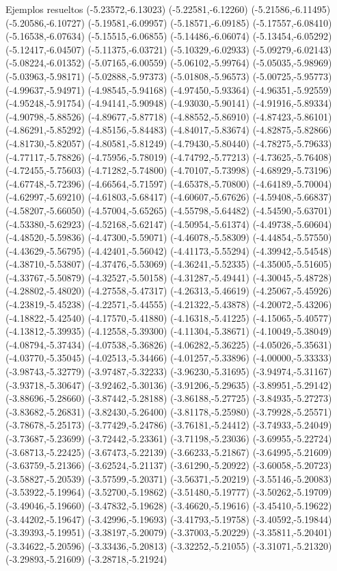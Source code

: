 \documentclass[11pt,a4paper]{article}
\begin{document}
\begin{fmex}{Ejemplos resueltos}
(-5.23572,-6.13023) (-5.22581,-6.12260) (-5.21586,-6.11495) (-5.20586,-6.10727) (-5.19581,-6.09957) (-5.18571,-6.09185) (-5.17557,-6.08410) (-5.16538,-6.07634) (-5.15515,-6.06855) (-5.14486,-6.06074) (-5.13454,-6.05292) (-5.12417,-6.04507) (-5.11375,-6.03721) (-5.10329,-6.02933) (-5.09279,-6.02143) (-5.08224,-6.01352) (-5.07165,-6.00559) (-5.06102,-5.99764) (-5.05035,-5.98969) (-5.03963,-5.98171) (-5.02888,-5.97373) (-5.01808,-5.96573) (-5.00725,-5.95773) (-4.99637,-5.94971) (-4.98545,-5.94168) (-4.97450,-5.93364) (-4.96351,-5.92559) (-4.95248,-5.91754) (-4.94141,-5.90948) (-4.93030,-5.90141) (-4.91916,-5.89334) (-4.90798,-5.88526) (-4.89677,-5.87718) (-4.88552,-5.86910) (-4.87423,-5.86101) (-4.86291,-5.85292) (-4.85156,-5.84483) (-4.84017,-5.83674) (-4.82875,-5.82866) (-4.81730,-5.82057) (-4.80581,-5.81249) (-4.79430,-5.80440) (-4.78275,-5.79633) (-4.77117,-5.78826) (-4.75956,-5.78019) (-4.74792,-5.77213) (-4.73625,-5.76408) (-4.72455,-5.75603) (-4.71282,-5.74800) (-4.70107,-5.73998) (-4.68929,-5.73196) (-4.67748,-5.72396) (-4.66564,-5.71597) (-4.65378,-5.70800) (-4.64189,-5.70004) (-4.62997,-5.69210) (-4.61803,-5.68417) (-4.60607,-5.67626) (-4.59408,-5.66837) (-4.58207,-5.66050) (-4.57004,-5.65265) (-4.55798,-5.64482) (-4.54590,-5.63701) (-4.53380,-5.62923) (-4.52168,-5.62147) (-4.50954,-5.61374) (-4.49738,-5.60604) (-4.48520,-5.59836) (-4.47300,-5.59071) (-4.46078,-5.58309) (-4.44854,-5.57550) (-4.43629,-5.56795) (-4.42401,-5.56042) (-4.41173,-5.55294) (-4.39942,-5.54548) (-4.38710,-5.53807) (-4.37476,-5.53069) (-4.36241,-5.52335) (-4.35005,-5.51605) (-4.33767,-5.50879) (-4.32527,-5.50158) (-4.31287,-5.49441) (-4.30045,-5.48728) (-4.28802,-5.48020) (-4.27558,-5.47317) (-4.26313,-5.46619) (-4.25067,-5.45926) (-4.23819,-5.45238) (-4.22571,-5.44555) (-4.21322,-5.43878) (-4.20072,-5.43206) (-4.18822,-5.42540) (-4.17570,-5.41880) (-4.16318,-5.41225) (-4.15065,-5.40577) (-4.13812,-5.39935) (-4.12558,-5.39300) (-4.11304,-5.38671) (-4.10049,-5.38049) (-4.08794,-5.37434) (-4.07538,-5.36826) (-4.06282,-5.36225) (-4.05026,-5.35631) (-4.03770,-5.35045) (-4.02513,-5.34466) (-4.01257,-5.33896) (-4.00000,-5.33333) (-3.98743,-5.32779) (-3.97487,-5.32233) (-3.96230,-5.31695) (-3.94974,-5.31167) (-3.93718,-5.30647) (-3.92462,-5.30136) (-3.91206,-5.29635) (-3.89951,-5.29142) (-3.88696,-5.28660) (-3.87442,-5.28188) (-3.86188,-5.27725) (-3.84935,-5.27273) (-3.83682,-5.26831) (-3.82430,-5.26400) (-3.81178,-5.25980) (-3.79928,-5.25571) (-3.78678,-5.25173) (-3.77429,-5.24786) (-3.76181,-5.24412) (-3.74933,-5.24049) (-3.73687,-5.23699) (-3.72442,-5.23361) (-3.71198,-5.23036) (-3.69955,-5.22724) (-3.68713,-5.22425) (-3.67473,-5.22139) (-3.66233,-5.21867) (-3.64995,-5.21609) (-3.63759,-5.21366) (-3.62524,-5.21137) (-3.61290,-5.20922) (-3.60058,-5.20723) (-3.58827,-5.20539) (-3.57599,-5.20371) (-3.56371,-5.20219) (-3.55146,-5.20083) (-3.53922,-5.19964) (-3.52700,-5.19862) (-3.51480,-5.19777) (-3.50262,-5.19709) (-3.49046,-5.19660) (-3.47832,-5.19628) (-3.46620,-5.19616) (-3.45410,-5.19622) (-3.44202,-5.19647) (-3.42996,-5.19693) (-3.41793,-5.19758) (-3.40592,-5.19844) (-3.39393,-5.19951) (-3.38197,-5.20079) (-3.37003,-5.20229) (-3.35811,-5.20401) (-3.34622,-5.20596) (-3.33436,-5.20813) (-3.32252,-5.21055) (-3.31071,-5.21320) (-3.29893,-5.21609) (-3.28718,-5.21924) 
\end{fmex}
\end{document}
